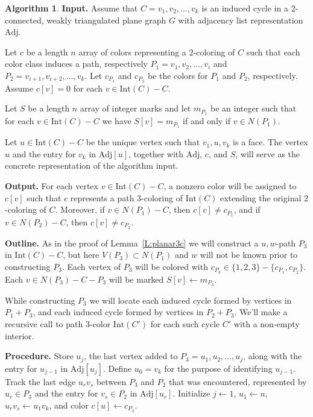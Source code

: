 \documentclass[12pt,letterpaper]{article}
\theoremstyle{plain}
\theoremstyle{definition}
\theoremstyle{break}
\newtheorem{algorithm}[lemma]{Algorithm}     %
\begin{document}
\begin{algorithm}\label{A:poh_linear}
\textbf{Input.} Assume that $C=v_1,v_2,\ldots,v_k$ is an induced cycle in a
$2$-connected, weakly triangulated plane
graph $G$ with adjacency list representation $\text{Adj}$.

Let $c$ be a length $n$ array of colors
representing a $2$-coloring of $C$ such
that each color class induces a path, respectively $P_1=v_1,v_2,\ldots,v_i$ and
$P_2=v_{i+1},v_{i+2},\ldots,v_k$. Let $c_{P_1}$ and $c_{P_2}$ be the colors
for $P_1$ and $P_2$, respectively. Assume $c[v]=0$ for each
$v\in\text{Int}(C)-C$.

Let $S$ be a length $n$ array of integer marks and let $m_{P_1}$ be an integer
such that for each $v\in\text{Int}(C)-C$ we have $S[v]=m_{P_1}$ if and only if
$v\in N(P_1)$.

Let $u\in\text{Int}(C)-C$ be the unique vertex such that $v_1,u,v_k$ is a face.
The vertex $u$ and the entry for $v_k$ in $\text{Adj}[u]$, together
with $\text{Adj}$, $c$, and $S$, will serve as the concrete
representation of the algorithm input.

\textbf{Output.} For each vertex $v\in\text{Int}(C)-C$, a nonzero color will be
assigned to $c[v]$ such that $c$ represents a path $3$-coloring of
$\text{Int}(C)$ extending the original $2$-coloring of $C$. Moreover, if
$v\in N(P_1)-C$, then $c[v]\ne c_{P_1}$, and if $v\in N(P_2)-C$, then
$c[v]\ne c_{P_2}$.

\textbf{Outline.} As in the proof of Lemma~\ref{L:planar3c} we will
construct a $u,w$-path $P_3$
in $\text{Int}(C)-C$, but here $V(P_3)\subset N(P_1)$ and $w$
will not be known prior to constructing $P_3$.
Each vertex of $P_3$ will be colored with
$c_{P_3}\in\{1,2,3\}-\{c_{P_1},c_{P_2}\}$. Each $v\in
N(P_3)-C-P_3$ will be marked $S[v]\leftarrow m_{P_3}$.

While constructing $P_3$ we will locate each induced cycle formed by
vertices in $P_1+P_3$, and each induced cycle formed by
vertices in $P_2+P_3$. We'll make a recursive call to path $3$-color
$\text{Int}(C')$ for
each such cycle $C'$ with a non-empty interior.

\textbf{Procedure.}
Store $u_j$, the last
vertex added to $P_3=u_1,u_2,\ldots,u_j$, along with the entry for
$u_{j-1}$ in $\text{Adj}[u_j]$. Define $u_0=v_k$ for the purpose
of identifying $u_{j-1}$. Track the
last edge $u_rv_s$ between $P_3$ and $P_2$ that was encountered,
represented by
$u_r\in P_3$ and the entry for $v_s\in P_2$ in $\text{Adj}[u_r]$.
Initialize $j\leftarrow 1$, $u_1\leftarrow u$, $u_rv_s\leftarrow u_1v_k$,
and color $c[u]\leftarrow c_{P_3}$. 


\end{algorithm}
\end{document}

